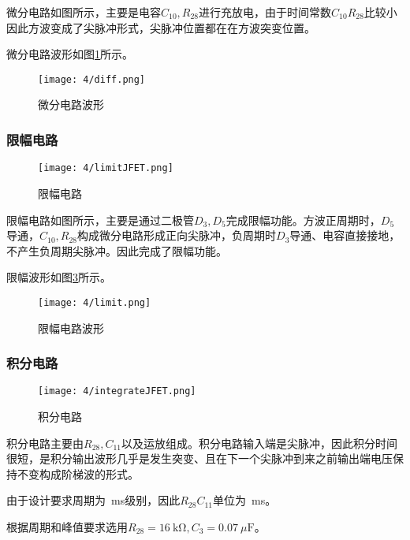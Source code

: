 微分电路如图所示，主要是电容$ C_{10}, R_{28} $进行充放电，由于时间常数$ C_{10}R_{28} $比较小因此方波变成了尖脉冲形式，尖脉冲位置都在在方波突变位置。

微分电路波形如图\ref{fig:微分电路波形}所示。

\begin{figure}[H]
	\centering
	\texttt{[image: 4/diff.png]}
	\caption{微分电路波形}
	\label{fig:微分电路波形}
\end{figure}

\subsubsection{限幅电路}%
\label{ssub:限幅电路}

\begin{figure}[H]
	\centering
	\texttt{[image: 4/limitJFET.png]}
	\caption{限幅电路}
	\label{fig:限幅电路}
\end{figure}

限幅电路如图所示，主要是通过二极管$ D_3, D_5 $完成限幅功能。方波正周期时，$ D_5 $导通，$ C_{10}, R_{28} $构成微分电路形成正向尖脉冲，负周期时$ D_3 $导通、电容直接接地，不产生负周期尖脉冲。因此完成了限幅功能。

限幅波形如图\ref{fig:限幅电路波形}所示。

\begin{figure}[H]
	\centering
	\texttt{[image: 4/limit.png]}
	\caption{限幅电路波形}
	\label{fig:限幅电路波形}
\end{figure}

\subsubsection{积分电路}%
\label{ssub:积分电路}

\begin{figure}[H]
	\centering
	\texttt{[image: 4/integrateJFET.png]}
	\caption{积分电路}
	\label{fig:积分电路}
\end{figure}

积分电路主要由$ R_{28}, C_{11} $以及运放组成。积分电路输入端是尖脉冲，因此积分时间很短，是积分输出波形几乎是发生突变、且在下一个尖脉冲到来之前输出端电压保持不变构成阶梯波的形式。

由于设计要求周期为\SI{}{\ms}级别，因此$ R_{28}C_{11} $单位为\SI{}{\ms}。

根据周期和峰值要求选用$ R_{28} = \SI{16}{\kohm}, C_3 = \SI{0.07}{\mu\F} $。

